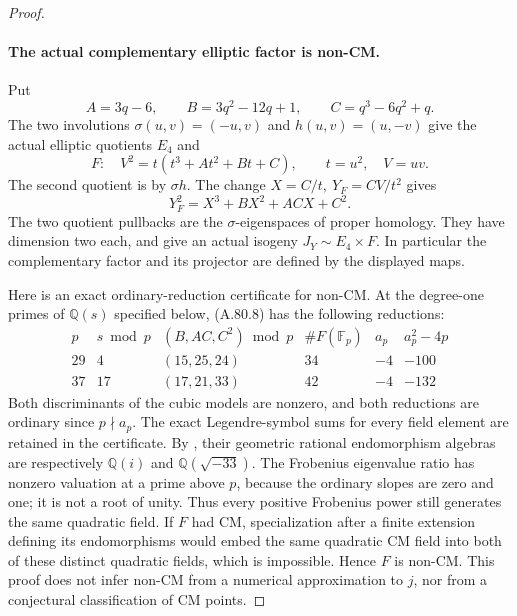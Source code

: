 \begin{proof}
\paragraph{The actual complementary elliptic factor is non-CM.}
Put
\[
 A=3q-6,\qquad B=3q^2-12q+1,\qquad C=q^3-6q^2+q.
                                                        \tag{A.80.6}
\]
The two involutions \(\sigma(u,v)=(-u,v)\) and
\(h(u,v)=(u,-v)\) give the actual elliptic quotients
\(E_4\) and
\[
 F:\quad V^2=t(t^3+At^2+Bt+C),\qquad t=u^2,\quad V=uv.
                                                        \tag{A.80.7}
\]
The second quotient is by \(\sigma h\). The change
\(X=C/t,\ Y_F=CV/t^2\) gives
\[
             Y_F^2=X^3+BX^2+ACX+C^2.                  \tag{A.80.8}
\]
The two quotient pullbacks are the \(\sigma\)-eigenspaces
of proper homology. They have dimension two each, and give
an actual isogeny \(J_Y\sim E_4\times F\). In particular
the complementary factor and its projector are defined by
the displayed maps.

Here is an exact ordinary-reduction certificate for non-CM.
At the degree-one primes of \(\mathbb Q(s)\) specified below,
(A.80.8) has the following reductions:
\[
\begin{array}{c|c|c|c|c|c}
 p&s\bmod p&(B,AC,C^2)\bmod p&\#F(\mathbb F_p)&a_p&a_p^2-4p\\\hline
29&4&(15,25,24)&34&-4&-100\\
37&17&(17,21,33)&42&-4&-132
\end{array}                                                   \tag{A.80.9}
\]
Both discriminants of the cubic models are nonzero, and both
reductions are ordinary since \(p\nmid a_p\). The exact
Legendre-symbol sums for every field element are retained in
the certificate. By \cite[Theorem V.3.1, printed p.145]
{fghSilvermanAEC}, their geometric rational endomorphism
algebras are respectively \(\mathbb Q(i)\) and
\(\mathbb Q(\sqrt{-33})\). The Frobenius eigenvalue ratio
has nonzero valuation at a prime above \(p\), because the
ordinary slopes are zero and one; it is not a root of unity.
Thus every positive Frobenius power still generates the same
quadratic field. If \(F\) had CM, specialization after a
finite extension defining its endomorphisms would embed the
same quadratic CM field into both of these distinct quadratic
fields, which is impossible. Hence \(F\) is non-CM.
This proof does not infer non-CM from a numerical approximation
to \(j\), nor from a conjectural classification of CM points.


\end{proof}
